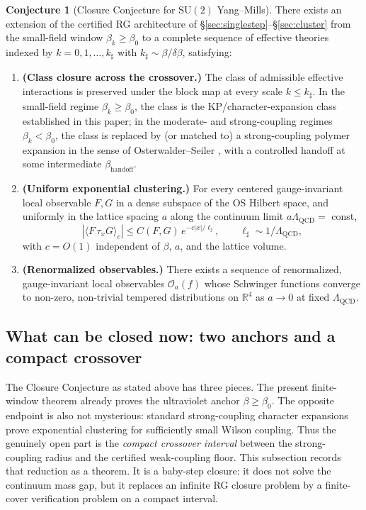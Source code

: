 \documentclass[11pt]{article}
\theoremstyle{definition}
\newtheorem{conjecture}[theorem]{Conjecture}
\newcommand{\SU}{\mathrm{SU}}
\newcommand{\R}{\mathbb{R}}
\newcommand{\Lam}{\Lambda_{\mathrm{QCD}}}
\begin{document}
\begin{conjecture}[Closure Conjecture for $\SU(2)$ Yang--Mills]
\label{conj:closure}
There exists an extension of the certified RG architecture of
\S\ref{sec:singlestep}--\S\ref{sec:cluster} from the small-field
window $\beta_k\ge\beta_0$ to a complete sequence of effective
theories indexed by $k=0,1,\ldots,k_\sharp$ with
$k_\sharp\sim\beta/\delta\beta$, satisfying:
\begin{enumerate}[label=\textup{(C\arabic*)},nosep]
\item \textbf{(Class closure across the crossover.)}
The class of admissible effective interactions is preserved
under the block map at every scale $k\le k_\sharp$.  In the
small-field regime $\beta_k\ge\beta_0$, the class is the
KP/character-expansion class established in this paper; in the
moderate- and strong-coupling regimes $\beta_k<\beta_0$, the
class is replaced by (or matched to) a strong-coupling polymer
expansion in the sense of Osterwalder--Seiler
\cite{OS78}, with a controlled handoff at some intermediate
$\beta_{\mathrm{handoff}}$.
\item \textbf{(Uniform exponential clustering.)}
For every centered gauge-invariant local observable $F,G$ in a
dense subspace of the OS Hilbert space, and uniformly in the
lattice spacing $a$ along the continuum limit
$a\Lam=$ const,
\[
|\langle F\,\tau_x G\rangle_c|
\le C(F,G)\,e^{-c|x|/\ell_\sharp},
\qquad \ell_\sharp\sim 1/\Lam,
\]
with $c=O(1)$ independent of $\beta$, $a$, and the lattice volume.
\item \textbf{(Renormalized observables.)}
There exists a sequence of renormalized, gauge-invariant local
observables $\mathcal{O}_a(f)$ whose Schwinger functions converge
to non-zero, non-trivial tempered distributions on $\R^4$ as
$a\to 0$ at fixed $\Lam$.
\end{enumerate}
\end{conjecture}

\subsection{What can be closed now: two anchors and a compact crossover}
\label{subsec:two-anchor-closure}

The Closure Conjecture as stated above has three pieces.  The present
finite-window theorem already proves the ultraviolet anchor
$\beta\ge\beta_0$.  The opposite endpoint is also not mysterious:
standard strong-coupling character expansions prove exponential
clustering for sufficiently small Wilson coupling.  Thus the genuinely
open part is the \emph{compact crossover interval} between the strong-
coupling radius and the certified weak-coupling floor.  This subsection
records that reduction as a theorem.  It is a baby-step closure: it does
not solve the continuum mass gap, but it replaces an infinite RG closure
problem by a finite-cover verification problem on a compact interval.
\end{document}

